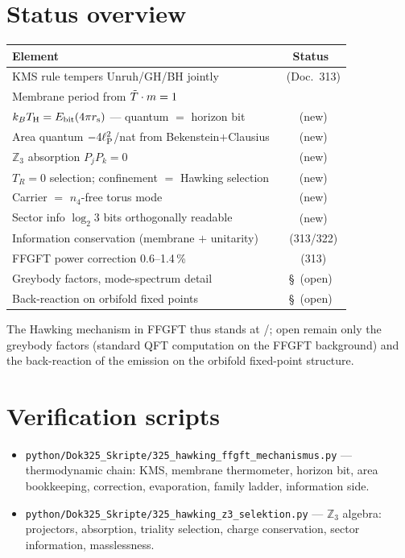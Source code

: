 \section{Status overview}

\begin{center}
\begin{tabular}{@{}lc@{}}
  \toprule
  \textbf{Element} & \textbf{Status} \\
  \midrule
  KMS rule tempers Unruh/GH/BH jointly & \K\ (Doc.\ 313) \\
  Membrane period from $\tilde{T}\cdot m = 1$ & \K \\
  $k_BT_{\mathrm{H}} = E_{\mathrm{bit}}(4\pi r_{\mathrm{s}})$ — quantum $=$ horizon bit & \K\ (new) \\
  Area quantum $-4\ell_{\mathrm{P}}^2$/nat from Bekenstein$+$Clausius & \B\ (new) \\
  $\mathbb{Z}_3$ absorption $P_jP_k = 0$ & \B\ (new) \\
  $T_R=0$ selection; confinement $=$ Hawking selection & \B\ (new) \\
  Carrier $=$ $n_4$-free torus mode & \K\ (new) \\
  Sector info $\log_2 3$ bits orthogonally readable & \B\ (new) \\
  Information conservation (membrane $+$ unitarity) & \K\ (313/322) \\
  FFGFT power correction 0.6--1.4\,\% & \K\ (313) \\
  Greybody factors, mode-spectrum detail & \S\ (open) \\
  Back-reaction on orbifold fixed points & \S\ (open) \\
  \bottomrule
\end{tabular}
\end{center}

The Hawking mechanism in FFGFT thus stands at \K/\B; open remain only
the greybody factors (standard QFT computation on the FFGFT background)
and the back-reaction of the emission on the orbifold fixed-point
structure.

\section*{Verification scripts}

\begin{itemize}
  \item \texttt{python/Dok325\_Skripte/325\_hawking\_ffgft\_mechanismus.py} —
    thermodynamic chain: KMS, membrane thermometer, horizon bit,
    area bookkeeping, correction, evaporation, family ladder,
    information side.
  \item \texttt{python/Dok325\_Skripte/325\_hawking\_z3\_selektion.py} —
    $\mathbb{Z}_3$ algebra: projectors, absorption, triality selection,
    charge conservation, sector information, masslessness.
\end{itemize}

